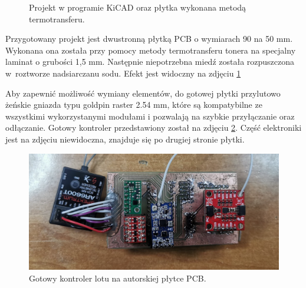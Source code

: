 \documentclass[12pt, a4paper]{article}
\begin{document}
\begin{figure}[ht]
    \centering
    \qquad
    \caption{Projekt w programie KiCAD oraz płytka wykonana metodą termotransferu.}
    \label{fig:stara}
\end{figure}

Przygotowany projekt jest dwustronną płytką PCB o wymiarach 90 na 50 mm. Wykonana ona została przy pomocy metody termotransferu tonera na specjalny laminat o grubości 1,5 mm. Następnie niepotrzebna miedź została rozpuszczona w~roztworze nadsiarczanu sodu. Efekt jest widoczny na zdjęciu \ref{fig:stara}

Aby zapewnić możliwość wymiany elementów, do gotowej płytki przylutowo żeńskie gniazda typu goldpin raster 2.54 mm, które są kompatybilne ze wszystkimi wykorzystanymi modułami i pozwalają na szybkie przyłączanie oraz odłączanie. Gotowy kontroler przedstawiony został na zdjęciu \ref{fig:starycaly}. Część elektroniki jest na zdjęciu niewidoczna, znajduje się po drugiej stronie płytki.

\begin{figure}[ht]
    \centering
    \includegraphics[width=1\textwidth]{kontorolerstary}
    \caption{Gotowy kontroler lotu na autorskiej płytce PCB.}
    \label{fig:starycaly}
\end{figure}
\end{document}
